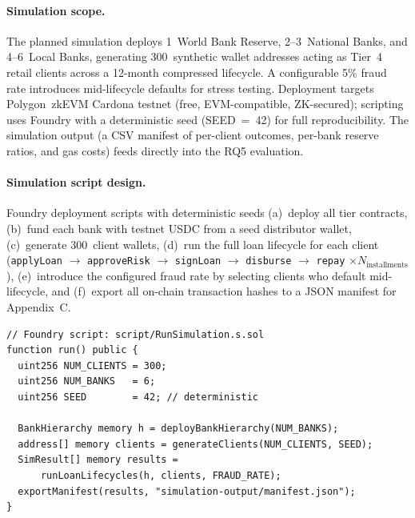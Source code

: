 \documentclass[12pt,a4paper]{report}
\begin{document}
\paragraph{Simulation scope.}
The planned simulation deploys 1~World Bank Reserve, 2--3~National Banks, and 4--6~Local Banks, generating 300~synthetic wallet addresses acting as Tier~4 retail clients across a 12-month compressed lifecycle. A configurable 5\% fraud rate introduces mid-lifecycle defaults for stress testing. Deployment targets Polygon~zkEVM Cardona testnet (free, EVM-compatible, ZK-secured); scripting uses Foundry with a deterministic seed (SEED~=~42) for full reproducibility. The simulation output (a CSV manifest of per-client outcomes, per-bank reserve ratios, and gas costs) feeds directly into the RQ5 evaluation.

\paragraph{Simulation script design.}
Foundry deployment scripts with deterministic seeds (a)~deploy all tier contracts, (b)~fund each bank with testnet USDC from a seed distributor wallet, (c)~generate 300~client wallets, (d)~run the full loan lifecycle for each client (\texttt{applyLoan} $\to$ \texttt{approveRisk} $\to$ \texttt{signLoan} $\to$ \texttt{disburse} $\to$ \texttt{repay} $\times N_\text{installments}$), (e)~introduce the configured fraud rate by selecting clients who default mid-lifecycle, and (f)~export all on-chain transaction hashes to a JSON manifest for Appendix~C.

\begin{lstlisting}[language=Solidity, caption={Foundry simulation entry-point (structure)}]
// Foundry script: script/RunSimulation.s.sol
function run() public {
  uint256 NUM_CLIENTS = 300;
  uint256 NUM_BANKS   = 6;
  uint256 SEED        = 42; // deterministic

  BankHierarchy memory h = deployBankHierarchy(NUM_BANKS);
  address[] memory clients = generateClients(NUM_CLIENTS, SEED);
  SimResult[] memory results =
      runLoanLifecycles(h, clients, FRAUD_RATE);
  exportManifest(results, "simulation-output/manifest.json");
}
\end{lstlisting}
\end{document}
